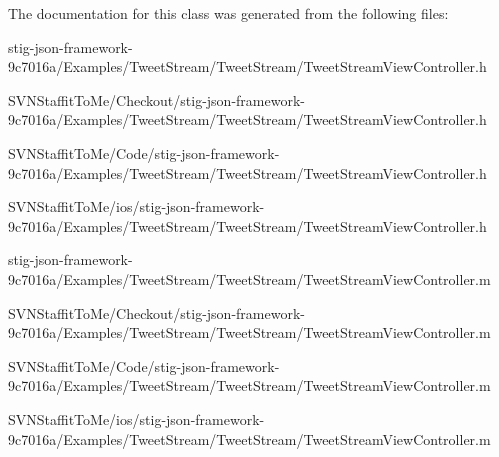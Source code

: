 \-The documentation for this class was generated from the following files\-:\begin{DoxyCompactItemize}
\item 
stig-\/json-\/framework-\/9c7016a/\-Examples/\-Tweet\-Stream/\-Tweet\-Stream/\-Tweet\-Stream\-View\-Controller.\-h\item 
\-S\-V\-N\-Staffit\-To\-Me/\-Checkout/stig-\/json-\/framework-\/9c7016a/\-Examples/\-Tweet\-Stream/\-Tweet\-Stream/\-Tweet\-Stream\-View\-Controller.\-h\item 
\-S\-V\-N\-Staffit\-To\-Me/\-Code/stig-\/json-\/framework-\/9c7016a/\-Examples/\-Tweet\-Stream/\-Tweet\-Stream/\-Tweet\-Stream\-View\-Controller.\-h\item 
\-S\-V\-N\-Staffit\-To\-Me/ios/stig-\/json-\/framework-\/9c7016a/\-Examples/\-Tweet\-Stream/\-Tweet\-Stream/\-Tweet\-Stream\-View\-Controller.\-h\item 
stig-\/json-\/framework-\/9c7016a/\-Examples/\-Tweet\-Stream/\-Tweet\-Stream/\-Tweet\-Stream\-View\-Controller.\-m\item 
\-S\-V\-N\-Staffit\-To\-Me/\-Checkout/stig-\/json-\/framework-\/9c7016a/\-Examples/\-Tweet\-Stream/\-Tweet\-Stream/\-Tweet\-Stream\-View\-Controller.\-m\item 
\-S\-V\-N\-Staffit\-To\-Me/\-Code/stig-\/json-\/framework-\/9c7016a/\-Examples/\-Tweet\-Stream/\-Tweet\-Stream/\-Tweet\-Stream\-View\-Controller.\-m\item 
\-S\-V\-N\-Staffit\-To\-Me/ios/stig-\/json-\/framework-\/9c7016a/\-Examples/\-Tweet\-Stream/\-Tweet\-Stream/\-Tweet\-Stream\-View\-Controller.\-m\end{DoxyCompactItemize}
